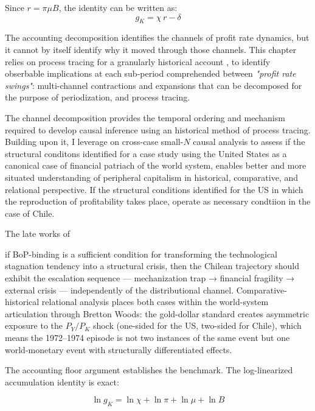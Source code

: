 \documentclass[11pt,a4paper]{article}
\begin{document}
{Since $r = \pi\mu B$, the identity can be written as:
\begin{equation}
	g_K = \chi\, r - \delta
	\label{eq:accum_compact}
\end{equation}

The accounting decomposition identifies the channels of profit rate dynamics, but 
it cannot by itself identify why it moved through
those channels. This chapter relies on process tracing for a granularly historical 
account \citep{Collier2011}, to identify obserbable implications at each sub-period 
comprehended between \textit{"profit rate swings"}: multi-channel contractions 
and expansions that can be decomposed for the purpose of periodization, and process tracing. 

The channel decomposition provides the temporal ordering and mechanism 
required to develop causal inference using an historical method of process tracing. Building upon it, 
I leverage on cross-case small-$N$ causal analysis \citep{Mahoney2000} to assess if the structural conditons 
identified for a case study using the United States as a canonical case of financial patriach of the world system, 
enables better and more situated understanding of peripheral capitalism in historical, comparative, and relational 
perspective. If the structural conditions identified for the US in which the reproduction of profitability takes place,
operate as necessary condtiion in the case of Chile. 

The late works of \cite{Prebisch1981} 


if BoP-binding is a sufficient condition for
transforming the technological stagnation tendency into a structural
crisis, then the Chilean trajectory should exhibit the escalation
sequence --- mechanization trap → financial fragility → external
crisis --- independently of the distributional channel. Comparative-historical
relational analysis \citep{Mahoney2004} places both cases within the
world-system articulation through Bretton Woods: the gold-dollar
standard creates asymmetric exposure to the $P_Y/P_K$ shock (one-sided
for the US, two-sided for Chile), which means the 1972--1974 episode
is not two instances of the same event but one world-monetary event
with structurally differentiated effects.

The accounting floor argument establishes the benchmark. The log-linearized
accumulation identity is exact:

\begin{equation}
	\label{eq:log_identity}
	\ln g_K = \ln \chi + \ln \pi + \ln \mu + \ln B
\end{equation}

}
\end{document}
